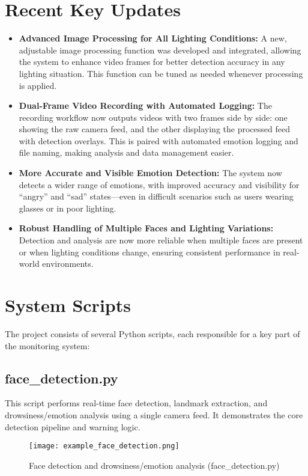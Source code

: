 \documentclass[12pt]{article}
\begin{document}
\section{Recent Key Updates}
\begin{itemize}
    \item \textbf{Advanced Image Processing for All Lighting Conditions:} A new, adjustable image processing function was developed and integrated, allowing the system to enhance video frames for better detection accuracy in any lighting situation. This function can be tuned as needed whenever processing is applied.
    \item \textbf{Dual-Frame Video Recording with Automated Logging:} The recording workflow now outputs videos with two frames side by side: one showing the raw camera feed, and the other displaying the processed feed with detection overlays. This is paired with automated emotion logging and file naming, making analysis and data management easier.
    \item \textbf{More Accurate and Visible Emotion Detection:} The system now detects a wider range of emotions, with improved accuracy and visibility for ``angry'' and ``sad'' states---even in difficult scenarios such as users wearing glasses or in poor lighting.
    \item \textbf{Robust Handling of Multiple Faces and Lighting Variations:} Detection and analysis are now more reliable when multiple faces are present or when lighting conditions change, ensuring consistent performance in real-world environments.
\end{itemize}

\section{System Scripts}
The project consists of several Python scripts, each responsible for a key part of the monitoring system:

\subsection{face\_detection.py}
This script performs real-time face detection, landmark extraction, and drowsiness/emotion analysis using a single camera feed. It demonstrates the core detection pipeline and warning logic.

\begin{figure}[h!]
    \centering
    \texttt{[image: example\_face\_detection.png]}
    \caption{Face detection and drowsiness/emotion analysis (face\_detection.py)}
\end{figure}
\end{document}
